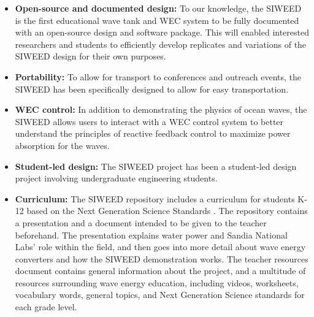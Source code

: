 \documentclass[11pt, letterpaper]{article}
\begin{document}
\begin{itemize}
  \item \textbf{Open-source and documented design:} To our knowledge, the SIWEED is the first educational wave tank and WEC system to be fully documented with an open-source design and software package.
  This will enabled interested researchers and students to efficiently develop replicates and variations of the SIWEED design for their own purposes.
  \item \textbf{Portability:} To allow for transport to conferences and outreach events, the SIWEED has been specifically designed to allow for easy transportation.
  \item \textbf{WEC control:} In addition to demonstrating the physics of ocean waves, the SIWEED allows users to interact with a WEC control system to better understand the principles of reactive feedback control to maximize power absorption for the waves.
  \item \textbf{Student-led design:} The SIWEED project has been a student-led design project involving undergraduate engineering students.
  \item \textbf{Curriculum:} The SIWEED repository includes a curriculum for students K-12 based on the Next Generation Science Standards \cite{NextGenScience2021}. 
  The repository contains a presentation and a document intended to be given to the teacher beforehand. 
  The presentation explains water power and Sandia National Labs' role within the field, and then goes into more detail about wave energy converters and how the SIWEED demonstration works.
  The teacher resources document contains general information about the project, and a multitude of resources surrounding wave energy education, including videos, worksheets, vocabulary words, general topics, and Next Generation Science standards for each grade level.
\end{itemize}
\end{document}
